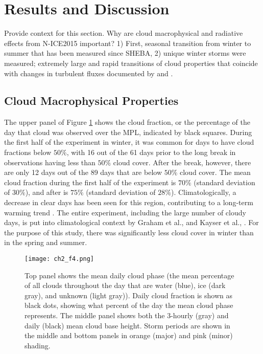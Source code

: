 \section{Results and Discussion}

Provide context for this section. Why are cloud macrophysical and radiative effects from N-ICE2015 important? 1) First, seasonal transition from winter to summer that has been measured since SHEBA, 2) unique winter storms were measured; extremely large and rapid transitions of cloud properties that coincide with changes in turbulent fluxes documented by \cite{walden:2017} and \cite{graham:2017}.

\subsection{Cloud Macrophysical Properties}

The upper panel of Figure \ref{fig:ch2_f4} shows the cloud fraction, or the percentage of the day that cloud was observed over the MPL, indicated by black squares. During the first half of the experiment in winter, it was common for days to have cloud fractions below $50 \%$, with 16 out of the 61 days prior to the long break in observations having less than $50 \%$ cloud cover. After the break, however, there are only 12 days out of the 89 days that are below $50 \%$ cloud cover. The mean cloud fraction during the first half of the experiment is $70 \%$ (standard deviation of $30 \%$), and after is $75 \%$ (standard deviation of $28 \%$). Climatologically, a decrease in clear days has been seen for this region, contributing to a long-term warming trend \cite{kayser:2017}. The entire experiment, including the large number of cloudy days, is put into climatological context by Graham et al., \cite{graham:2017} and Kayser et al., \cite{kayser:2017}. For the purpose of this study, there was significantly less cloud cover in winter than in the spring and summer.

\begin{figure}[H]
    \centering
    \texttt{[image: ch2\_f4.png]}
    \caption[Cloud fraction/phase, height, and temperature.]{Top panel shows the mean daily cloud phase (the mean percentage of all clouds throughout the day that are water (blue), ice (dark gray), and unknown (light gray)). Daily cloud fraction is shown as black dots, showing what percent of the day the mean cloud phase represents. The middle panel shows both the 3-hourly (gray) and daily (black) mean cloud base height. Storm periods are shown in the middle and bottom panels in orange (major) and pink (minor) shading.}
    \label{fig:ch2_f4}
\end{figure}



